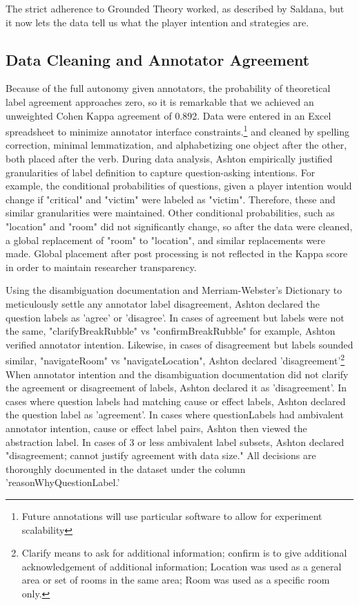 \documentclass[10pt]{article}
\begin{document}
The strict adherence to Grounded Theory worked, as described by Saldana, but it now lets the data tell us what the player intention and strategies are.



\subsection{Data Cleaning and Annotator Agreement}
Because of the full autonomy given annotators, the probability of theoretical label agreement approaches zero, so it is remarkable that we achieved an unweighted Cohen Kappa agreement of 0.892. Data were entered in an Excel spreadsheet to minimize annotator interface constraints.\footnote{Future annotations will use particular software to allow for experiment scalability} and cleaned by spelling correction, minimal lemmatization, and alphabetizing one object after the other, both placed after the verb. During data analysis, Ashton empirically justified granularities of label definition to capture question-asking intentions. For example, the conditional probabilities of questions, given a player intention would change if "critical" and "victim" were labeled as "victim". Therefore, these and similar granularities were maintained. Other conditional probabilities, such as "location" and "room" did not significantly change, so after the data were cleaned, a global replacement of "room" to "location", and similar replacements were made. Global placement after post processing is not reflected in the Kappa score in order to maintain researcher transparency.

Using the disambiguation documentation and Merriam-Webster's Dictionary to meticulously settle any annotator label disagreement, Ashton declared the question labels as 'agree' or 'disagree'. In cases of agreement but labels were not the same, "clarifyBreakRubble" vs "confirmBreakRubble" for example, Ashton verified annotator intention. Likewise, in cases of disagreement but labels sounded similar, "navigateRoom" vs "navigateLocation", Ashton declared 'disagreement'\footnote{Clarify means to ask for additional information; confirm is to give additional acknowledgement of additional information; Location was used as a general area or set of rooms in the same area; Room was used as a specific room only.} When annotator intention and the disambiguation documentation did not clarify the agreement or disagreement of labels, Ashton declared it as 'disagreement'. In cases where question labels had matching cause or effect labels, Ashton declared the question label as 'agreement'. In cases where questionLabels had ambivalent annotator intention, cause or effect label pairs, Ashton then viewed the abstraction label. In cases of 3 or less ambivalent label subsets, Ashton declared "disagreement; cannot justify agreement with data size." All decisions are thoroughly documented in the dataset under the column 'reasonWhyQuestionLabel.' 
\end{document}
